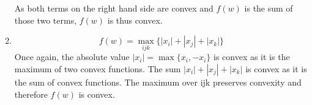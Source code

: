 \begin{enumerate}
\par As both terms on the right hand side are convex and $f(w)$ is the sum of those two terms, $f(w)$ is thus convex.

\par\item\begin{equation}
f(w) = \max_{ijk}\{|x_{i}|+|x_{j}|+|x_{k}|\}
\end{equation}
Once again, the absolute value $|x_{i}| = \max\{x_{i},-x_{i}\}$ is convex as it is the maximum of two convex functions.  The sum $|x_{i}|+|x_{j}|+|x_{k}|$ is convex as it is the sum of convex functions.  The maximum over ijk preserves convexity and therefore $f(w)$ is convex.
\end{enumerate}
